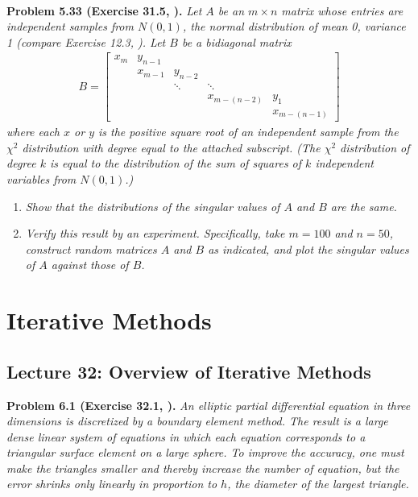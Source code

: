 \documentclass[a4paper,oneside]{book}
\numberwithin{equation}{chapter}
\begin{document}
\\
\textbf{Problem 5.33 (Exercise 31.5, \cite{1}).} \textit{Let $A$ be an $m\times n$ matrix whose entries are independent samples from $N\left(0,1\right)$, the normal distribution of mean 0, variance 1 (compare Exercise 12.3, \cite{1}). Let $B$ be a bidiagonal matrix}
\begin{align}
B = \left[ {\begin{array}{*{20}{c}}
{{x_m}}&{{y_{n - 1}}}&{}&{}&{}\\
{}&{{x_{m - 1}}}&{{y_{n - 2}}}&{}&{}\\
{}&{}& \ddots & \ddots &{}\\
{}&{}&{}&{{x_{m - \left( {n - 2} \right)}}}&{{y_1}}\\
{}&{}&{}&{}&{{x_{m - \left( {n - 1} \right)}}}
\end{array}} \right]
\end{align}
\textit{where each $x$ or $y$ is the positive square root of an independent sample from the $\chi ^2$ distribution with degree equal to the attached subscript. (The $\chi ^2$ distribution of degree $k$ is equal to the distribution of the sum of squares of $k$ independent variables from $N\left(0,1\right)$.)}
\begin{enumerate}
\item \textit{Show that the distributions of the singular values of $A$ and $B$ are the same.}
\item \textit{Verify this result by an experiment. Specifically, take $m=100$ and $n=50$, construct random matrices $A$ and $B$ as indicated, and plot the singular values of $A$ against those of $B$.}
\end{enumerate}


\chapter{Iterative Methods}
\section{Lecture 32: Overview of Iterative Methods}
\textbf{Problem 6.1 (Exercise 32.1, \cite{1}).} \textit{An elliptic partial differential equation in three dimensions is discretized by a boundary element method. The result is a large dense linear system of equations in which each equation corresponds to a triangular surface element on a large sphere. To improve the accuracy, one must make the triangles smaller and thereby increase the number of equation, but the error shrinks only linearly in proportion to $h$, the diameter of the largest triangle.}
\end{document}
